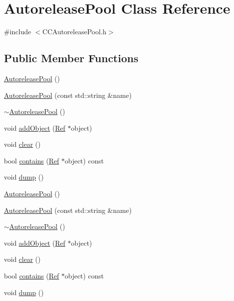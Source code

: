 \hypertarget{classAutoreleasePool}{}\section{Autorelease\+Pool Class Reference}
\label{classAutoreleasePool}


{\ttfamily \#include $<$C\+C\+Autorelease\+Pool.\+h$>$}

\subsection*{Public Member Functions}
\begin{DoxyCompactItemize}
\item 
\hyperlink{classAutoreleasePool_a8eb236761eacf2caf327b597f4759175}{Autorelease\+Pool} ()
\item 
\hyperlink{classAutoreleasePool_ac294293fe0029e3d494f95f1a8bb02d8}{Autorelease\+Pool} (const std\+::string \&name)
\item 
\hyperlink{classAutoreleasePool_ab44bff785343ae6d16dc67b9f4812079}{$\sim$\+Autorelease\+Pool} ()
\item 
void \hyperlink{classAutoreleasePool_ad040d66ae891c4593ed8939bb53ce539}{add\+Object} (\hyperlink{classRef}{Ref} $\ast$object)
\item 
void \hyperlink{classAutoreleasePool_a4a63abbe5e742993c70760810d1a8442}{clear} ()
\item 
bool \hyperlink{classAutoreleasePool_ab79484b084ab8dcb8799c71a34a653fc}{contains} (\hyperlink{classRef}{Ref} $\ast$object) const
\item 
void \hyperlink{classAutoreleasePool_abae69c2b9da80a71bcb095cb557a03d0}{dump} ()
\item 
\hyperlink{classAutoreleasePool_af8cd9f894ff35d9ae149bb13eb495545}{Autorelease\+Pool} ()
\item 
\hyperlink{classAutoreleasePool_ac294293fe0029e3d494f95f1a8bb02d8}{Autorelease\+Pool} (const std\+::string \&name)
\item 
\hyperlink{classAutoreleasePool_ab44bff785343ae6d16dc67b9f4812079}{$\sim$\+Autorelease\+Pool} ()
\item 
void \hyperlink{classAutoreleasePool_ad040d66ae891c4593ed8939bb53ce539}{add\+Object} (\hyperlink{classRef}{Ref} $\ast$object)
\item 
void \hyperlink{classAutoreleasePool_a4a63abbe5e742993c70760810d1a8442}{clear} ()
\item 
bool \hyperlink{classAutoreleasePool_ab79484b084ab8dcb8799c71a34a653fc}{contains} (\hyperlink{classRef}{Ref} $\ast$object) const
\item 
void \hyperlink{classAutoreleasePool_abae69c2b9da80a71bcb095cb557a03d0}{dump} ()
\end{DoxyCompactItemize}


